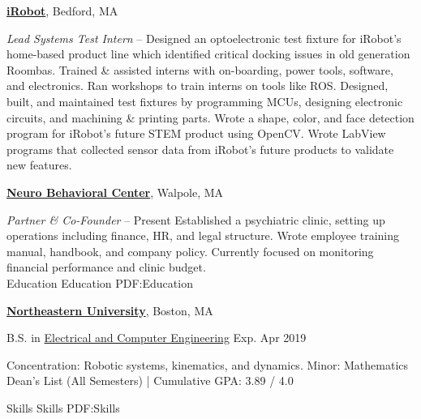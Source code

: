 \documentclass[letterpaper,MMMyyyy,nonstopmode]{simpleresumecv}
\begin{document}
\begin{Body}

\Entry
\href{http://www.irobot.com}
{\textbf{iRobot}},
Bedford, MA

\Gap
\textit{Lead Systems Test Intern}
\hfill
{} -- 
\BulletItem
Designed an optoelectronic test fixture for iRobot's home-based product line which identified critical docking issues in old generation Roombas. %
\BulletItem
Trained \& assisted interns with on-boarding, power tools, software, and electronics. Ran workshops to train interns on tools like ROS.
\BulletItem
Designed, built, and maintained test fixtures by programming MCUs, designing electronic circuits, and machining \& printing parts.
\BulletItem
Wrote a shape, color, and face detection program for iRobot's future STEM product using OpenCV.
\BulletItem
Wrote LabView programs that collected sensor data from iRobot's future products to validate new features.
\SectionSpace


\Entry
\href{https://www.nbchealthcare.com/}
{\textbf{Neuro Behavioral Center}},
Walpole, MA

\Gap
\textit{Partner \& Co-Founder}
\hfill
{} -- Present
\BulletItem
Established a psychiatric clinic, setting up operations including finance, HR, and legal structure.
\BulletItem
Wrote employee training manual, handbook, and company policy.
\BulletItem
Currently focused on monitoring financial performance and clinic budget.\\


\Section
{Education}
{Education}
{PDF:Education}


\Entry
\href{http://www.northeastern.edu}
{\textbf{Northeastern University}},
Boston, MA

\Gap
B.S. in 
\href{http://www.ece.neu.edu/}
{Electrical and Computer Engineering}
\hfill
Exp. Apr 2019
\begin{Detail}
	\SubBulletItem
	Concentration: Robotic systems, kinematics, and dynamics.
	\SubBulletItem
	Minor: Mathematics
	\SubBulletItem
	Dean's List (All Semesters) | Cumulative GPA: 3.89 / 4.0
\end{Detail}


\Section
{Skills}
{Skills}
{PDF:Skills}


\end{Body}
\end{document}
